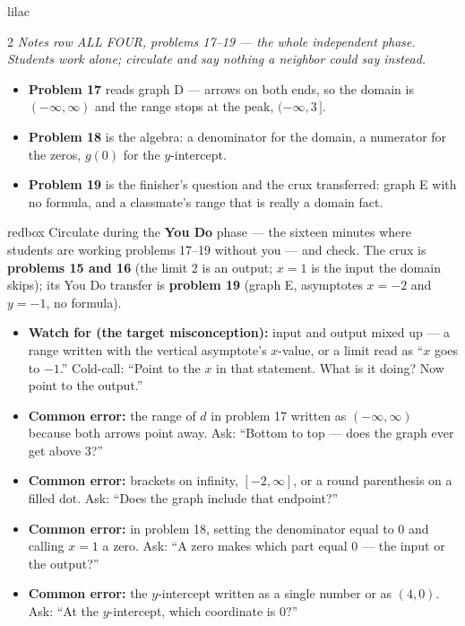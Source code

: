 \documentclass[10pt]{article}
\begin{document}
\begin{skillbox}{lilac}
\begin{multicols}{2}
\textit{Notes row ALL FOUR, problems 17--19 --- the whole independent phase. Students work
alone; circulate and say nothing a neighbor could say instead.}
\begin{itemize}
  \item \textbf{Problem 17} reads graph D --- arrows on both ends, so the domain is
        $(-\infty, \infty)$ and the range stops at the peak, $(-\infty, 3\,]$.
  \item \textbf{Problem 18} is the algebra: a denominator for the domain, a numerator for the
        zeros, $g(0)$ for the $y$-intercept.
  \item \textbf{Problem 19} is the finisher's question and the crux transferred: graph E with
        no formula, and a classmate's range that is really a domain fact.
\end{itemize}
\end{multicols}
\end{skillbox}

\begin{skillbox}{redbox}
Circulate during the \textbf{You Do} phase --- the sixteen minutes where students are working
problems 17--19 without you --- and check. The crux is \textbf{problems 15 and 16} (the limit 2
is an output; $x = 1$ is the input the domain skips); its You Do transfer is \textbf{problem
19} (graph E, asymptotes $x = -2$ and $y = -1$, no formula).
\begin{itemize}
  \item \textbf{Watch for (the target misconception):} input and output mixed up --- a range
        written with the vertical asymptote's $x$-value, or a limit read as ``$x$ goes to
        $-1$.'' Cold-call: ``Point to the $x$ in that statement. What is it doing? Now point to
        the output.''
  \item \textbf{Common error:} the range of $d$ in problem 17 written as $(-\infty, \infty)$
        because both arrows point away. Ask: ``Bottom to top --- does the graph ever get above
        3?''
  \item \textbf{Common error:} brackets on infinity, $[-2, \infty]$, or a round parenthesis on a
        filled dot. Ask: ``Does the graph include that endpoint?''
  \item \textbf{Common error:} in problem 18, setting the denominator equal to 0 and calling
        $x = 1$ a zero. Ask: ``A zero makes which part equal 0 --- the input or the output?''
  \item \textbf{Common error:} the $y$-intercept written as a single number or as $(4, 0)$.
        Ask: ``At the $y$-intercept, which coordinate is 0?''
\end{itemize}
\end{skillbox}
\end{document}
